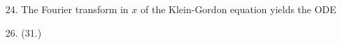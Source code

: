 \documentclass[11pt,leqno]{article}
\theoremstyle{plain}
\theoremstyle{definition}
\numberwithin{equation}{section}
\numberwithin{lem}{section}
\begin{document}
\begin{enumerate}
\begin{enumerate}
    \end{enumerate}
    \item[24.] The Fourier transform in $x$ of the Klein-Gordon equation yields the ODE 
    \item[26.] (31.)
\end{enumerate}
\end{document}
